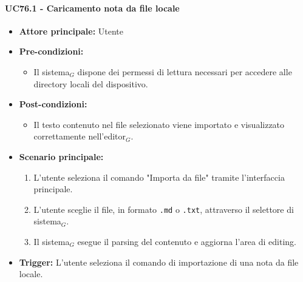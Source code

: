 \documentclass[a4paper, 10pt]{article}
\begin{document}
\paragraph{UC76.1 - Caricamento nota da file locale}
\hypertarget{uc:76.1}{}
\begin{itemize}
    \item \textbf{Attore principale:} Utente
    \item \textbf{Pre-condizioni:} 
        \begin{itemize}
            \item Il sistema$_G$ dispone dei permessi di lettura necessari per accedere alle directory locali del dispositivo.
        \end{itemize}
    \item \textbf{Post-condizioni:} 
        \begin{itemize}
            \item Il testo contenuto nel file selezionato viene importato e visualizzato correttamente nell'editor$_G$.
        \end{itemize}
    \item \textbf{Scenario principale:}
        \begin{enumerate}
            \item L'utente seleziona il comando "Importa da file" tramite l'interfaccia principale.
            \item L'utente sceglie il file, in formato \texttt{.md} o \texttt{.txt}, attraverso il selettore di sistema$_G$.
            \item Il sistema$_G$ esegue il parsing del contenuto e aggiorna l'area di editing.
        \end{enumerate}
    \item \textbf{Trigger:} L'utente seleziona il comando di importazione di una nota da file locale.
\end{itemize}
\end{document}
